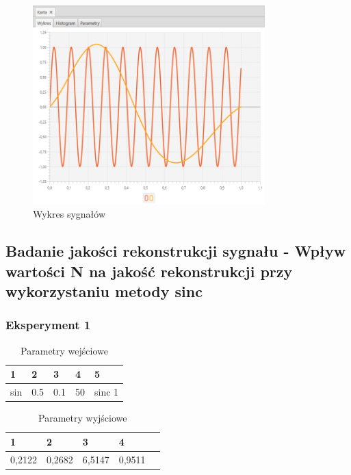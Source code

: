 \documentclass[12pt]{article}
\begin{document}
{{{                \begin{figure}[H]
                    \centering
                    \includegraphics[width=0.8\textwidth]{img/result/experiment3/03/data_draw_original_chart_recon_output_130535.png}
                    \caption{Wykres sygnałów}
                \end{figure}
            }
            \newpage

        }

        \subsection{Badanie jakości rekonstrukcji sygnału - Wpływ wartości N na jakość
        rekonstrukcji przy wykorzystaniu metody sinc} {

            \subsubsection{Eksperyment 1} {
                \begin{table}[H]
                    \centering
                    \begin{tabular}{|l|l|l|l|l|}
                        \hline
                        1 & 2 & 3 & 4 & 5   \\ \hline
                        sin & 0.5 & 0.1 & 50 & sinc 1  \\ \hline
                    \end{tabular}
                    \caption{Parametry wejściowe}
                \end{table}

                \begin{table}[H]
                    \centering
                    \begin{tabular}{|l|l|l|l|l|}
                        \hline
                        1 & 2 & 3 & 4   \\ \hline
                        0,2122 & 0,2682 & 6,5147 & 0,9511 \\ \hline
                    \end{tabular}
                    \caption{Parametry wyjściowe}
                \end{table}


}}}
\end{document}
